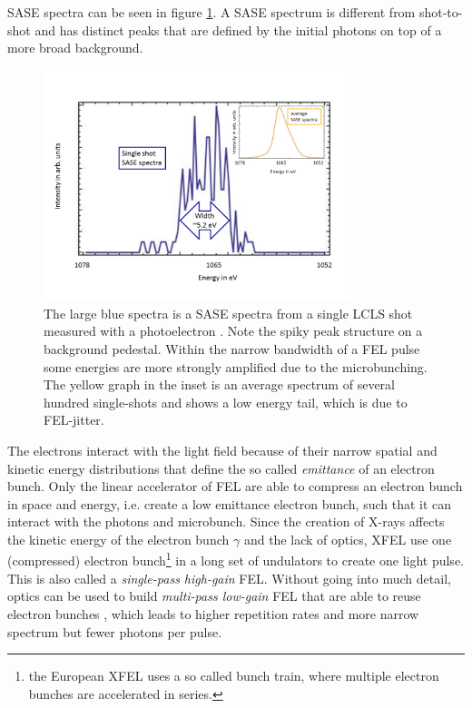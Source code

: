 SASE spectra can be seen in figure \ref{fig:SASE-spectra}. A SASE spectrum is different from shot-to-shot and has distinct peaks that are defined by the initial photons on top of a more broad background.
\begin{figure}
	\centering
		\includegraphics[width=0.80\textwidth]{images/SASE-spectra.png}
	\caption[SASE single-shot and average spectra]{The large blue spectra is a SASE spectra from a single LCLS shot measured with a photoelectron \citep[see][]{Bucher-2014-Unpublished}. Note the spiky peak structure on a background pedestal. Within the narrow bandwidth of a FEL pulse some energies are more strongly amplified due to the microbunching. The yellow graph in the inset is an average spectrum of several hundred single-shots and shows a low energy tail, which is due to FEL-jitter.}
	\label{fig:SASE-spectra}
\end{figure}
The electrons interact with the light field because of their narrow spatial and kinetic energy distributions that define the so called \textit{emittance} of an electron bunch. Only the linear accelerator of FEL are able to compress an electron bunch in space and energy, i.e. create a low emittance electron bunch, such that it can interact with the photons and microbunch. Since the creation of X-rays affects the kinetic energy of the electron bunch $\gamma$ and the lack of optics, XFEL use one (compressed) electron bunch\footnote{the European XFEL uses a so called bunch train, where multiple electron bunches are accelerated in series.} in a long set of undulators to create one light pulse. This is also called a \textit{single-pass high-gain} FEL. Without going into much detail, optics can be used to build \textit{multi-pass low-gain} FEL that are able to reuse electron bunches \citep{Kim-2008-PRL}, which leads to higher repetition rates and more narrow spectrum but fewer photons per pulse.
%
%
%
%
